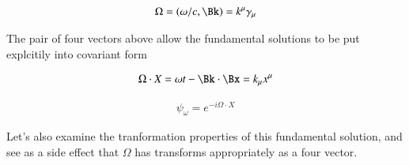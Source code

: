 \documentclass{article}
\begin{document}
\begin{align}
\Omega = (\omega/c, \Bk) = k^\mu \gamma_\mu
\end{align}

The pair of four vectors above allow the fundamental solutions to be put explcitily into covariant form

\begin{align}
\Omega \cdot X = \omega t - \Bk \cdot \Bx = k_\mu x^\mu
\end{align}

\begin{align}
\psi_\omega = e^{-i \Omega \cdot X}
\end{align}

Let's also examine the tranformation properties of this fundamental solution, and see as a side effect that $\Omega$
has transforms appropriately as a four vector.



\end{document}
